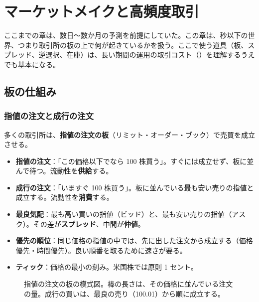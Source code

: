\chapter{マーケットメイクと高頻度取引}
\label{ch:mm}

ここまでの章は、数日〜数か月の予測を前提にしていた。この章は、秒以下の世界、つまり取引所の板の上で何が起きているかを扱う。ここで使う道具（板、スプレッド、逆選択、在庫）は、長い期間の運用の取引コスト（）を理解するうえでも基本になる。

\section{板の仕組み}

\subsection{指値の注文と成行の注文}

多くの取引所は、\textbf{指値の注文の板}（リミット・オーダー・ブック）で売買を成立させる。

\begin{itemize}
\item \textbf{指値の注文}：「この価格以下でなら 100 株買う」。すぐには成立せず、板に並んで待つ。流動性を\textbf{供給}する。
\item \textbf{成行の注文}：「いますぐ 100 株買う」。板に並んでいる最も安い売りの指値と成立する。流動性を\textbf{消費}する。
\item \textbf{最良気配}：最も高い買いの指値（ビッド）と、最も安い売りの指値（アスク）。その差が\textbf{スプレッド}、中間が\textbf{仲値}。
\item \textbf{優先の順位}：同じ価格の指値の中では、先に出した注文から成立する（価格優先・時間優先）。良い順番を取るために速さが要る。
\item \textbf{ティック}：価格の最小の刻み。米国株では原則 1 セント。
\end{itemize}

\begin{figure}[H]
\centering
{}
\caption{指値の注文の板の模式図。棒の長さは、その価格に並んでいる注文の量。成行の買いは、最良の売り（100.01）から順に成立する。}
\label{fig:lob}
\end{figure}

